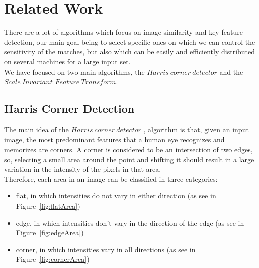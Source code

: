 \chapter{Related Work}
\label{chap:relatedWork}

There are a lot of algorithms which focus on image similarity and key feature detection, our main goal being to select specific ones on which we can control the sensitivity of the matches, but also which can be easily and efficiently distributed on several machines for a large input set. \\
We have focused on two main algorithms, the $Harris\ corner\ detector$ and the $Scale\ Invariant$ $Feature\ Transform$.


\section{Harris Corner Detection}

The main idea of the $Harris\ corner\ detector$ \cite{harrisCorner}, \cite{harrisCorner2} algorithm is that, given an input image, the most predominant features that a human eye recognizes and memorizes are corners. A corner is considered to be an intersection of two edges, so, selecting a small area around the point and shifting it should result in a large variation in the intensity of the pixels in that area. \\
Therefore, each area in an image can be classified in three categories:
\begin{itemize}
	\item flat, in which intensities do not vary in either direction (as see in Figure~\ref{fig:flatArea})
	\item edge, in which intensities don't vary in the direction of the edge (as see in Figure~\ref{fig:edgeArea})
	\item corner, in which intensities vary in all directions (as see in Figure~\ref{fig:cornerArea})
\end{itemize}

